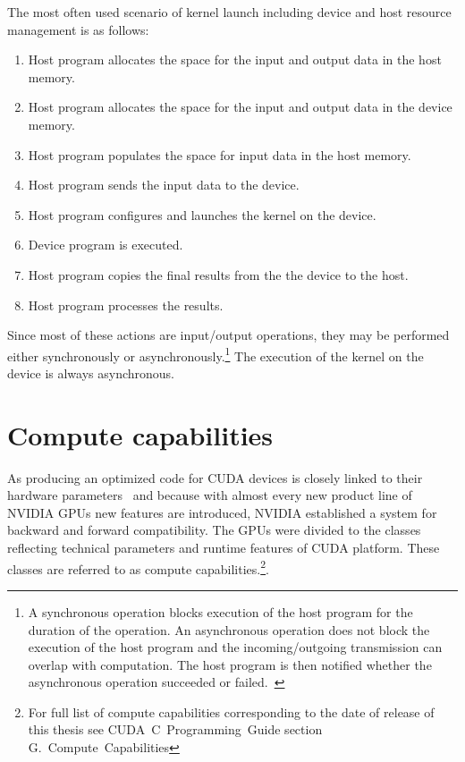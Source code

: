 \documentclass[12pt,oneside]{fithesis2}
\begin{document}
The most often used scenario of kernel launch including device and host resource management is as follows:
\begin{enumerate}[noitemsep]
	\item Host program allocates the space for the input and output data in the host memory.
	\item Host program allocates the space for the input and output data in the device memory.
	\item Host program populates the space for input data in the host memory.
	\item Host program sends the input data to the device.
	\item Host program configures and launches the kernel on the device.
	\item Device program is executed.
	\item Host program copies the final results from the the device to the host.
	\item Host program processes the results. 
\end{enumerate}

\noindent
Since most of these actions are input/output operations, they may be performed either synchronously or asynchronously.\footnote{A synchronous operation blocks execution of the host program for the duration of the operation. An asynchronous operation does not block the execution of the host program and the incoming/outgoing transmission can overlap with computation. The host program is then notified whether the asynchronous operation succeeded or failed.~\cite{async_io}} The execution of the kernel on the device is always asynchronous.~\cite{cuda_guide}

\section{Compute capabilities}

As producing an optimized code for CUDA devices is closely linked to their hardware parameters~\cite{cuda_best_practices} and because with almost every new product line of NVIDIA GPUs new features are introduced, NVIDIA established a system for backward and forward compatibility. The GPUs were divided to the classes reflecting technical parameters and runtime features of CUDA platform. These classes are referred to as compute capabilities.\footnote{For full list of compute capabilities corresponding to the date of release of this thesis see CUDA~C~Programming~Guide \cite{cuda_guide} section G.~Compute~Capabilities}.
\end{document}
